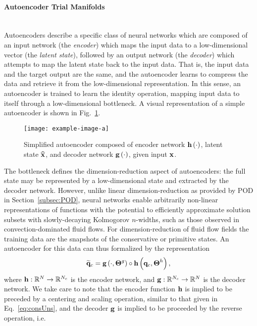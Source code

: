 \paragraph{Autoencoder Trial Manifolds}\mbox{}\\
%
Autoencoders describe a specific class of neural networks which are composed of an input network (the \textit{encoder}) which maps the input data to a low-dimensional vector (the \textit{latent state}), followed by an output network (the \textit{decoder}) which attempts to map the latent state back to the input data. That is, the input data and the target output are the same, and the autoencoder learns to compress the data and retrieve it from the low-dimensional representation. In this sense, an autoencoder is trained to learn the identity operation, mapping input data to itself through a low-dimensional bottleneck. A visual representation of a simple autoencoder is shown in Fig.~\ref{fig:aeSample}. 
%
\begin{figure}
    \centering
    \texttt{[image: example-image-a]}
    \caption{\label{fig:aeSample}Simplified autoencoder composed of encoder network $\mathbf{h} \left(\cdot\right)$, latent state $\mathbf{\widehat{x}}$, and decoder network $\mathbf{g} \left(\cdot\right)$, given input $\mathbf{x}$.}
\end{figure}
%
The bottleneck defines the dimension-reduction aspect of autoencoders: the full state may be represented by a low-dimensional state and extracted by the decoder network. However, unlike linear dimension-reduction as provided by POD in Section~\ref{subsec:POD}, neural networks enable arbitrarily non-linear representations of functions with the potential to efficiently approximate solution subsets with slowly-decaying Kolmogorov $n$-widths, such as those observed in convection-dominated fluid flows. For dimension-reduction of fluid flow fields the training data are the snapshots of the conservative or primitive states. An autoencoder for this data can thus formalized by the representation
%
\begin{equation}
    \mathbf{\widetilde{q}}_{c} = \mathbf{g} \left(\cdot, \boldsymbol{\Theta}^{g}\right) \circ \mathbf{h} \left(\mathbf{q}_{c}, \boldsymbol{\Theta}^{h}\right),
\end{equation}
%
where $\mathbf{h}: \mathbb{R}^{N} \rightarrow \mathbb{R}^{N_c}$ is the encoder network, and $\mathbf{g}: \mathbb{R}^{N_c} \rightarrow \mathbb{R}^{N}$ is the decoder network. We take care to note that the encoder function $\mathbf{h}$ is implied to be preceded by a centering and scaling operation, similar to that given in Eq.~\ref{eq:consUns}, and the decoder $\mathbf{g}$ is implied to be proceeded by the reverse operation, i.e. 
